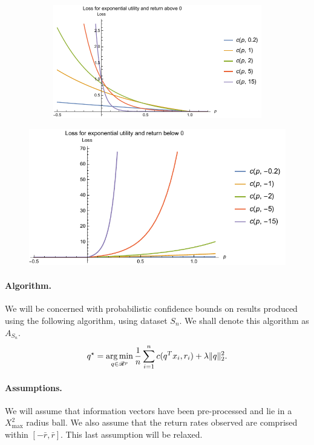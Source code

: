 \begin{figure}
  \centering
  \begin{subfigure}{.4\textwidth}
  \includegraphics[width=1.1\textwidth]{ExpULossAboveZero.pdf}
\end{subfigure}%
\begin{minipage}{.4\textwidth}
  \includegraphics[width=1.1\textwidth]{ExpULossBelowZero.pdf}
\end{minipage}
\end{figure}

\paragraph{Algorithm.}
We will be concerned with probabilistic confidence bounds on results produced using the
following algorithm, using dataset $S_n$. We shall denote this algorithm as $A_{S_n}$.
\begin{equation}
  \label{algo}
  q^\star = \operatorname*{arg\,min}_{q\in\mathscr{R}^p}\frac{1}{n} \sum_{i=1}^{n} c(q^Tx_i,r_i) + \lambda\|q\|^2_2.
\end{equation}

\paragraph{Assumptions.}
We will assume that information vectors have been pre-processed and lie in a $X^2_{\max}$
radius ball. We also assume that the return rates observed are comprised within $[-\bar r,
\bar r]$. This last assumption will be relaxed. 


